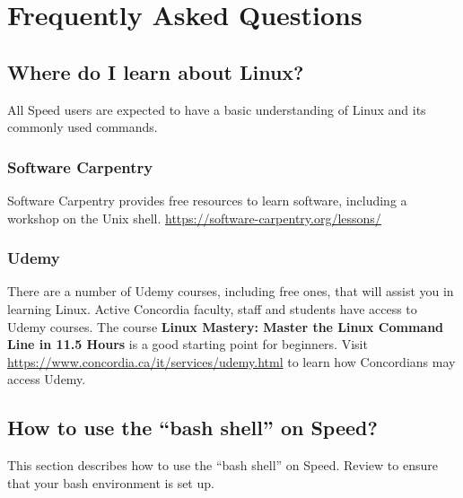 \section{Frequently Asked Questions}
\label{sect:faqs}

\subsection{Where do I learn about Linux?}
\label{sect:faqs-linux}

All Speed users are expected to have a basic understanding of Linux and its commonly used commands.

\subsubsection*{Software Carpentry}

Software Carpentry provides free resources to learn software, including a workshop on the Unix shell.
\url{https://software-carpentry.org/lessons/} 

\subsubsection*{Udemy}

There are a number of Udemy courses, including free ones, that will assist 
you in learning Linux. Active Concordia faculty, staff and students have 
access to Udemy courses. The course \textbf{Linux Mastery: Master the Linux 
Command Line in 11.5 Hours} is a good starting point for beginners. Visit
\url{https://www.concordia.ca/it/services/udemy.html} to learn how Concordians 
may access Udemy.

\subsection{How to use the ``bash shell'' on Speed?}

This section describes how to use the ``bash shell'' on Speed. Review
 to ensure that your bash environment is set up.

